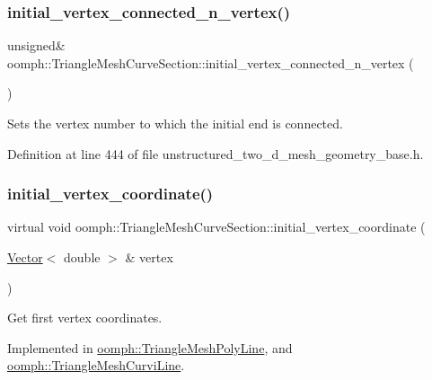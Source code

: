 \subsubsection{\texorpdfstring{initial\+\_\+vertex\+\_\+connected\+\_\+n\+\_\+vertex()}{initial\_vertex\_connected\_n\_vertex()}\hspace{0.1cm}{\footnotesize\ttfamily [2/2]}}
{\footnotesize\ttfamily unsigned\& oomph\+::\+Triangle\+Mesh\+Curve\+Section\+::initial\+\_\+vertex\+\_\+connected\+\_\+n\+\_\+vertex (\begin{DoxyParamCaption}{ }\end{DoxyParamCaption})\hspace{0.3cm}{\ttfamily [inline]}}



Sets the vertex number to which the initial end is connected. 



Definition at line 444 of file unstructured\+\_\+two\+\_\+d\+\_\+mesh\+\_\+geometry\+\_\+base.\+h.

\mbox{\label{classoomph_1_1TriangleMeshCurveSection_a08c60883b595a52280c486badf8a4210}} 
\subsubsection{\texorpdfstring{initial\+\_\+vertex\+\_\+coordinate()}{initial\_vertex\_coordinate()}}
{\footnotesize\ttfamily virtual void oomph\+::\+Triangle\+Mesh\+Curve\+Section\+::initial\+\_\+vertex\+\_\+coordinate (\begin{DoxyParamCaption}\item[{\hyperlink{classoomph_1_1Vector}{Vector}$<$ double $>$ \&}]{vertex }\end{DoxyParamCaption})\hspace{0.3cm}{\ttfamily [pure virtual]}}



Get first vertex coordinates. 



Implemented in \hyperlink{classoomph_1_1TriangleMeshPolyLine_ac5970458ab4954408d512495c003e5f0}{oomph\+::\+Triangle\+Mesh\+Poly\+Line}, and \hyperlink{classoomph_1_1TriangleMeshCurviLine_a164a96e8cce279bce6cb3f01f5bf6170}{oomph\+::\+Triangle\+Mesh\+Curvi\+Line}.



